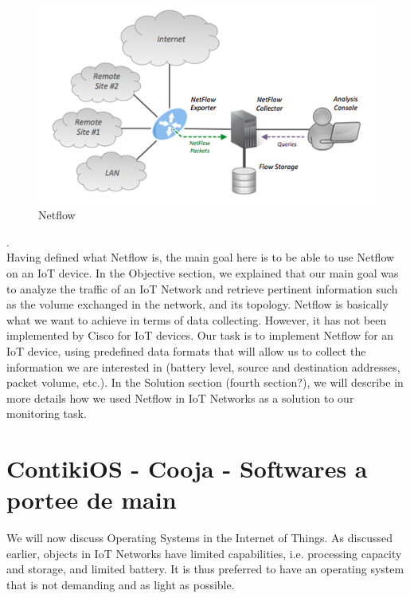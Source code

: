\begin{figure}
  \centering
  \includegraphics[width=\textwidth]{res/netflow.png}
  \caption{Netflow}
  \label{fig:netflow}
\end{figure}

.\\

Having defined what Netflow is, the main goal here is to be able to use Netflow on an IoT device. In the Objective section, we explained that our main goal was to analyze the traffic of an IoT Network and retrieve pertinent information such as the volume exchanged in the network, and its topology. Netflow is basically what we want to achieve in terms of data collecting. However, it has not been implemented by Cisco for IoT devices. Our task is to implement Netflow for an IoT device, using predefined data formats that will allow us to collect the information we are interested in (battery level, source and destination addresses, packet volume, etc.). In the Solution section (fourth section?), we will describe in more details how we used Netflow in IoT Networks as a solution to our monitoring task.

\section{ContikiOS - Cooja - Softwares a portee de main}

We will now discuss Operating Systems in the Internet of Things. As discussed earlier, objects in IoT Networks have limited capabilities, i.e. processing capacity and storage, and limited battery. It is thus preferred to have an operating system that is not demanding and as light as possible. \\

